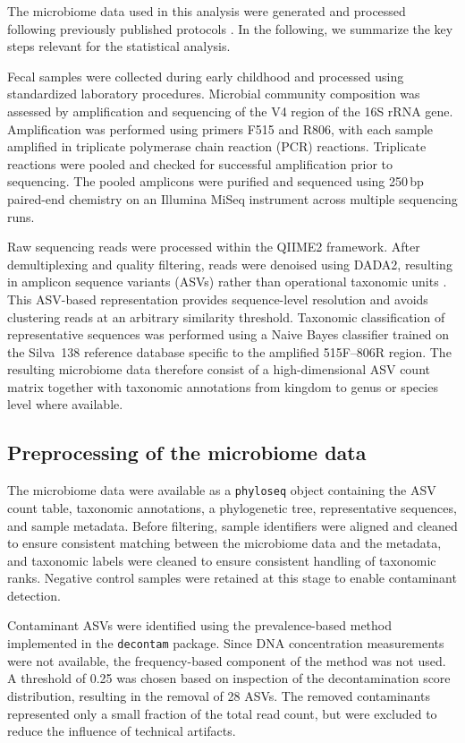 The microbiome data used in this analysis were generated and processed following previously published protocols \citep{depner2025janus}. In the following, we summarize the key steps relevant for the statistical analysis.

Fecal samples were collected during early childhood and processed using standardized laboratory procedures. Microbial community composition was assessed by amplification and sequencing of the V4 region of the 16S rRNA gene. Amplification was performed using primers F515 and R806, with each sample amplified in triplicate polymerase chain reaction (PCR) reactions. Triplicate reactions were pooled and checked for successful amplification prior to sequencing. The pooled amplicons were purified and sequenced using 250\,bp paired-end chemistry on an Illumina MiSeq instrument across multiple sequencing runs.

Raw sequencing reads were processed within the QIIME2 framework. After demultiplexing and quality filtering, reads were denoised using DADA2, resulting in amplicon sequence variants (ASVs) rather than operational taxonomic units \citep{callahan2016dada2}. This ASV-based representation provides sequence-level resolution and avoids clustering reads at an arbitrary similarity threshold. Taxonomic classification of representative sequences was performed using a Naive Bayes classifier trained on the Silva~138 reference database specific to the amplified 515F--806R region. The resulting microbiome data therefore consist of a high-dimensional ASV count matrix together with taxonomic annotations from kingdom to genus or species level where available.

\subsection{Preprocessing of the microbiome data}

The microbiome data were available as a \texttt{phyloseq} object containing the ASV count table, taxonomic annotations, a phylogenetic tree, representative sequences, and sample metadata. Before filtering, sample identifiers were aligned and cleaned to ensure consistent matching between the microbiome data and the metadata, and taxonomic labels were cleaned to ensure consistent handling of taxonomic ranks. Negative control samples were retained at this stage to enable contaminant detection.

Contaminant ASVs were identified using the prevalence-based method implemented in the \texttt{decontam} package. Since DNA concentration measurements were not available, the frequency-based component of the method was not used. A threshold of 0.25 was chosen based on inspection of the decontamination score distribution, resulting in the removal of 28 ASVs. The removed contaminants represented only a small fraction of the total read count, but were excluded to reduce the influence of technical artifacts.

